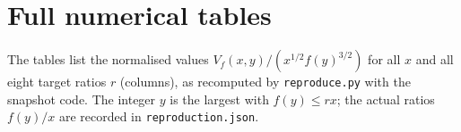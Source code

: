 \chapter{Full numerical tables}\label{app:tables}

The tables list the normalised values $V_f(x,y)/(x^{1/2}f(y)^{3/2})$ for all $x$ and all eight target ratios $r$ (columns), as recomputed by \texttt{reproduce.py} with the snapshot code. The integer $y$ is the largest with $f(y)\le rx$; the actual ratios $f(y)/x$ are recorded in \texttt{reproduction.json}.

\begin{table}[ht]
\centering\small

\caption{Normalised variance $V_f(x,y)/(x^{1/2}f(y)^{3/2})$ for $f(t)=t^2+1$; rows: $x$, columns: target ratio $r$.}
\end{table}

\begin{table}[ht]
\centering\small

\caption{Normalised variance $V_f(x,y)/(x^{1/2}f(y)^{3/2})$ for $f(t)=t^3+2$; rows: $x$, columns: target ratio $r$.}
\end{table}

\begin{table}[ht]
\centering\small

\caption{Normalised variance $V_f(x,y)/(x^{1/2}f(y)^{3/2})$ for $f(t)=2t+1$; rows: $x$, columns: target ratio $r$.}
\end{table}

